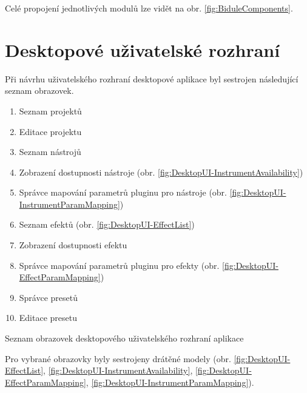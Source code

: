 \documentclass[thesis=M,czech]{FITthesis}[2019/03/06]
\begin{document}
			Celé propojení jednotlivých modulů lze vidět na obr. \ref{fig:BiduleComponents}.

	\section{Desktopové uživatelské rozhraní}
		Při návrhu uživatelského rozhraní desktopové aplikace byl sestrojen následující seznam obrazovek.
		\begin{mylist}
			\begin{enumerate}[label=\textbf{D\arabic*.}]
				\item Seznam projektů
				\item Editace projektu
				\item Seznam nástrojů
				\item Zobrazení dostupnosti nástroje (obr. \ref{fig:DesktopUI-InstrumentAvailability})
				\item Správce mapování parametrů pluginu pro nástroje (obr. \ref{fig:DesktopUI-InstrumentParamMapping})
				\item Seznam efektů (obr. \ref{fig:DesktopUI-EffectList})
				\item Zobrazení dostupnosti efektu
				\item Správce mapování parametrů pluginu pro efekty	(obr. \ref{fig:DesktopUI-EffectParamMapping})		
				\item Správce presetů
				\item Editace presetu
			\end{enumerate}
			\caption{Seznam obrazovek desktopového uživatelského rozhraní aplikace}\label{list:DesktopUIScreen}		
		\end{mylist}
	
		Pro vybrané obrazovky byly sestrojeny drátěné modely 
		(obr. \ref{fig:DesktopUI-EffectList}, \ref{fig:DesktopUI-InstrumentAvailability}, 
		\ref{fig:DesktopUI-EffectParamMapping}, \ref{fig:DesktopUI-InstrumentParamMapping}).
		
\end{document}

